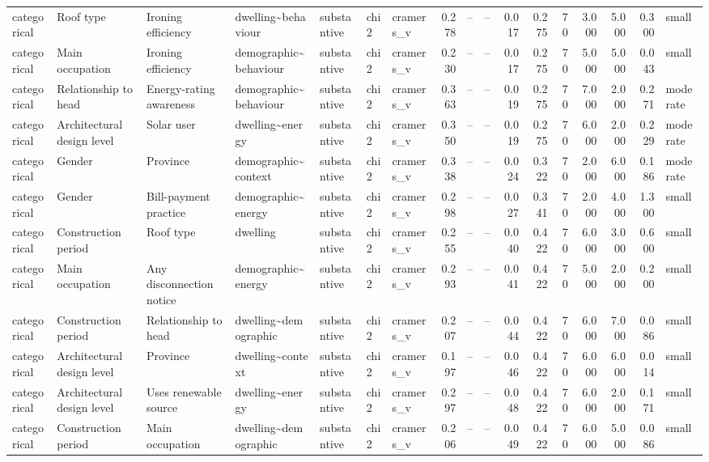\begin{table}
\begin{tabular}{lllllllrrrrrrrrrl}
categorical & Roof type & Ironing efficiency & dwelling\textasciitilde behaviour & substantive & chi2 & cramers\_v & 0.278 & -- & -- & 0.017 & 0.275 & 70 & 3.000 & 5.000 & 0.300 & small \\
categorical & Main occupation & Ironing efficiency & demographic\textasciitilde behaviour & substantive & chi2 & cramers\_v & 0.230 & -- & -- & 0.017 & 0.275 & 70 & 5.000 & 5.000 & 0.043 & small \\
categorical & Relationship to head & Energy-rating awareness & demographic\textasciitilde behaviour & substantive & chi2 & cramers\_v & 0.363 & -- & -- & 0.019 & 0.275 & 70 & 7.000 & 2.000 & 0.271 & moderate \\
categorical & Architectural design level & Solar user & dwelling\textasciitilde energy & substantive & chi2 & cramers\_v & 0.350 & -- & -- & 0.019 & 0.275 & 70 & 6.000 & 2.000 & 0.229 & moderate \\
categorical & Gender & Province & demographic\textasciitilde context & substantive & chi2 & cramers\_v & 0.338 & -- & -- & 0.024 & 0.322 & 70 & 2.000 & 6.000 & 0.186 & moderate \\
categorical & Gender & Bill-payment practice & demographic\textasciitilde energy & substantive & chi2 & cramers\_v & 0.298 & -- & -- & 0.027 & 0.341 & 70 & 2.000 & 4.000 & 1.300 & small \\
categorical & Construction period & Roof type & dwelling & substantive & chi2 & cramers\_v & 0.255 & -- & -- & 0.040 & 0.422 & 70 & 6.000 & 3.000 & 0.600 & small \\
categorical & Main occupation & Any disconnection notice & demographic\textasciitilde energy & substantive & chi2 & cramers\_v & 0.293 & -- & -- & 0.041 & 0.422 & 70 & 5.000 & 2.000 & 0.200 & small \\
categorical & Construction period & Relationship to head & dwelling\textasciitilde demographic & substantive & chi2 & cramers\_v & 0.207 & -- & -- & 0.044 & 0.422 & 70 & 6.000 & 7.000 & 0.086 & small \\
categorical & Architectural design level & Province & dwelling\textasciitilde context & substantive & chi2 & cramers\_v & 0.197 & -- & -- & 0.046 & 0.422 & 70 & 6.000 & 6.000 & 0.014 & small \\
categorical & Architectural design level & Uses renewable source & dwelling\textasciitilde energy & substantive & chi2 & cramers\_v & 0.297 & -- & -- & 0.048 & 0.422 & 70 & 6.000 & 2.000 & 0.171 & small \\
categorical & Construction period & Main occupation & dwelling\textasciitilde demographic & substantive & chi2 & cramers\_v & 0.206 & -- & -- & 0.049 & 0.422 & 70 & 6.000 & 5.000 & 0.086 & small \\

\end{tabular}
\end{table}
